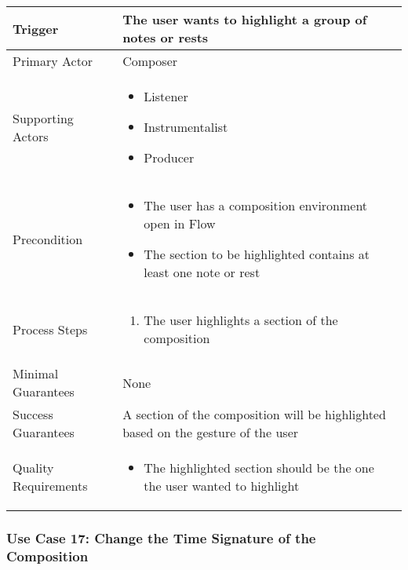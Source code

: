 \begin{tabularx}{\textwidth}{|X|X|}
\hline
Trigger & 
The user wants to highlight a group of notes or rests \\
\hline
Primary Actor & 
Composer \\
\hline
Supporting Actors & 
\begin{itemize}
\item Listener
\item Instrumentalist
\item Producer
\end{itemize} \\
\hline
Precondition & 
\begin{itemize}
\item The user has a composition environment open in Flow
\item The section to be highlighted contains at least one note or rest
\end{itemize} \\
\hline
Process Steps & 
\begin{enumerate}
\item The user highlights a section of the composition
\end{enumerate} \\
\hline
Minimal Guarantees & 
None \\
\hline
Success Guarantees & 
A section of the composition will be highlighted based on the gesture of the user \\
\hline
Quality Requirements & 
\begin{itemize}
\item The highlighted section should be the one the user wanted to highlight
\end{itemize} \\ 
\hline
\end{tabularx}

\subsubsection{Use Case 17: Change the Time Signature of the Composition}


